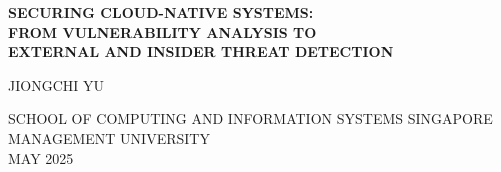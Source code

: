 \documentclass[titlepage,a4paper,12pt,thmsb]{report}
\begin{document}


\begin{titlepage}
\thispagestyle{empty}

\begin{center}

{\bf \fontsize{16pt}{\baselineskip}\selectfont SECURING CLOUD-NATIVE SYSTEMS: \\[0cm] FROM VULNERABILITY ANALYSIS TO\\[.1cm]
EXTERNAL AND INSIDER THREAT DETECTION}

\vspace{5cm}

{\Large JIONGCHI YU}

\vfill
{\Large SCHOOL OF COMPUTING AND INFORMATION SYSTEMS}
{\Large SINGAPORE MANAGEMENT UNIVERSITY \\[0.3cm]
MAY 2025}

\end{center}

\end{titlepage}
\newpage

\end{document}
